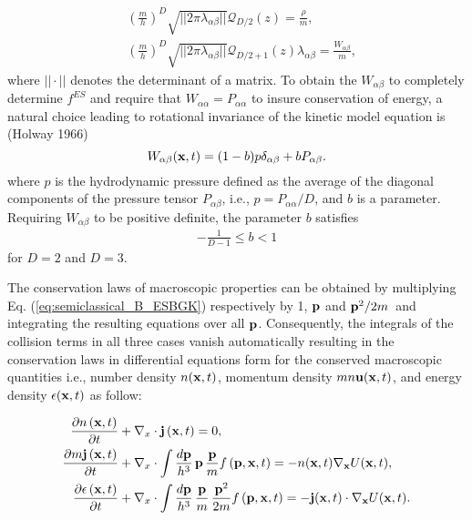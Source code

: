 \documentclass{rsproca}%
\begin{document}
\begin{align}
&(\frac{m}{h})^D \sqrt{ ||2 \pi \lambda_{\alpha \beta}|| } \mathcal{Q}_{D/2}(z)= \frac{\rho}{m}, \\
&(\frac{m}{h})^D \sqrt{ ||2 \pi \lambda_{\alpha \beta}|| } \mathcal{Q}_{D/2 +1}(z) \lambda_{\alpha \beta} = \frac{W_{\alpha \beta}}{m},
\end{align}
where $||\cdot ||$ denotes the determinant of a matrix.   To obtain the $W_{\alpha \beta}$ to completely determine $f^{ES}$ and require that $W_{\alpha \alpha}=P_{\alpha \alpha}$ to insure conservation of energy, a natural choice leading to rotational invariance of the kinetic model equation is (Holway 1966)
\begin{equation}
W_{\alpha \beta}({\bf x},t) = (1 - b) p \delta_{\alpha \beta} + b P_{\alpha \beta}.
\end{equation}
where $p$ is the hydrodynamic pressure defined as the average of the diagonal components of the pressure tensor $P_{\alpha \beta}$, i.e., $p = P_{\alpha \alpha}/D$, and $b$ is a parameter.  Requiring $ W_{\alpha \beta}$ to be positive definite, the parameter $b$ satisfies
\begin{align}
-\frac{1}{D-1} \le b < 1
\end{align}
for $D=2$ and $D=3$.

The conservation laws of macroscopic properties can be obtained by multiplying Eq. (\ref{eq:semiclassical_B_ESBGK}) respectively by 1, ${\bf p}$ and \({\bf p}^2/2m\)\, and integrating the resulting equations over all ${\bf p}$.  Consequently, the integrals of the collision terms in all three cases vanish automatically resulting in the conservation laws in differential equations form for the conserved macroscopic quantities i.e., number density \(n({\bf x},t)\), momentum density \(m n {\bf u}({\bf x},t)\), and energy density \(\epsilon({\bf x},t)\) as follow:

\begin{subequations}
\begin{align}
\frac{\partial n\left({\bf x},t\right)}{\partial t}&+{\bf \nabla }_x\cdot{\bf j}\left({\bf x},t\right)=0, \\
\frac{\partial m\/{\bf j}\left({\bf x},t\right)}{\partial t}&+{\bf \nabla }_x\cdot\int{\frac{d{\bf p}}{h^3}}\,{\bf p}\,\frac{\bf p}{m}f\left({\bf p},{\bf x},t\right)= -n({\bf x},t){\bf \nabla}_{\bf x}U({\bf x},t), \\
\frac{\partial \epsilon \left({\bf x},t\right)}{\partial t}&+{\bf \nabla }_x\cdot\int{\frac{d\bf p}{h^3}}\,\frac{\bf p}{m}\,\frac{{\bf p}^2}{2m}f\left({\bf p},{\bf x},t\right)=-{\bf j}({\bf x},t)\cdot{\bf \nabla}_{\bf x}U({\bf x},t).
\end{align}
\label{eq:semiclassical_ES_Euler}
\end{subequations}
\end{document}

